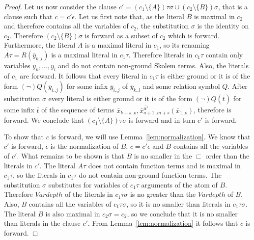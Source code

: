 \documentclass[english, shortabstract]{iithesis}
\theoremstyle{definition} \newtheorem{definition}{Definition}[chapter]
\theoremstyle{remark} \newtheorem{remark}[definition]{Observation}
\theoremstyle{plain} \newtheorem{theorem}[definition]{Theorem}
\theoremstyle{plain} \newtheorem{lemma}[definition]{Lemma}
\begin{document}
\begin{proof}
Let us now consider the clause $c'=(c_1\setminus\{A\})\tau\sigma \cup (c_2\setminus\{B\})\sigma$, 
that is a clause such that $c=c'\epsilon$.
Let us first note that, as the literal $B$ is maximal in $c_2$ and therefore contains all the variables of $c_2$, 
the substitution $\sigma$ is the identity on $c_2$. Therefore $(c_2\setminus\{B\})\sigma$ is forward as a subset of $c_2$ which is forward.
Furthermore, the literal $A$ is a maximal literal in $c_1$, so its renaming $A\tau=R(\bar{y}_{k..l})$ is a maximal literal in $c_1\tau$.
Therefore literals in $c_1\tau$ contain only variables $y_k,\dots,y_l$ and do not contain non-ground Skolem terms.
Also, the literals of $c_1$ are forward.
It follows that every literal in $c_1\tau$ is either ground or it is of the form $(\lnot)Q(\bar{y}_{i..j})$ for some infix $\bar{y}_{i..j}$ of $\bar{y}_{k..l}$ and some relation symbol $Q$.
After substitution $\sigma$ every literal is either ground or it is of the form $(\lnot)Q(\bar{t})$ for some infix $\bar{t}$ of the sequence of terms $\bar{x}_{k+s..o}, \bar{x}^{\bar{\alpha'}}_{{o+1..m+s}}(\bar{x}_{1..o})$, therefore is forward.
We conclude that $(c_1\setminus\{A\})\tau\sigma$ is forward and in turn $c'$ is forward.

To show that $c$ is forward, we will use Lemma~\ref{lem:normalization}.
We know that $c'$ is forward, $\epsilon$ is the normalization of $B$, $c=c'\epsilon$ and $B$ contains all the variables of $c'$.
What remains to be shown is that $B$ is no smaller in the $\sqsubset$ order than the literals in $c'$.
The literal $A\tau$ does not contain function terms and is maximal in $c_1\tau$, 
so the literals in $c_1\tau$ do not contain non-ground function terms.
The substitution $\sigma$ substitutes for variables of $c_1\tau$ arguments of the atom of $B$.
Therefore $\mathit{Vardepth}$ of the literals in $c_1\tau\sigma$ is no greater than the $\mathit{Vardepth}$ of $B$.
Also, $B$ contains all the variables of $c_1\tau\sigma$, so it is no smaller than literals in $c_1\tau\sigma$.
The literal $B$ is also maximal in $c_2\sigma=c_2$, so we conclude that it is no smaller than literals in the clause $c'$.
From Lemma~\ref{lem:normalization} it follows that $c$ is forward.


\end{proof}
\end{document}
